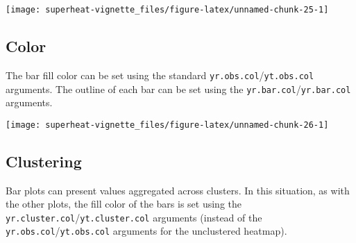 \documentclass[]{book}
\newenvironment{Shaded}{\begin{snugshade}}{\end{snugshade}}
\newcommand{\KeywordTok}[1]{\textcolor[rgb]{0.13,0.29,0.53}{\textbf{{#1}}}}
\newcommand{\DataTypeTok}[1]{\textcolor[rgb]{0.13,0.29,0.53}{{#1}}}
\newcommand{\FloatTok}[1]{\textcolor[rgb]{0.00,0.00,0.81}{{#1}}}
\newcommand{\StringTok}[1]{\textcolor[rgb]{0.31,0.60,0.02}{{#1}}}
\newcommand{\CommentTok}[1]{\textcolor[rgb]{0.56,0.35,0.01}{\textit{{#1}}}}
\newcommand{\NormalTok}[1]{{#1}}
\theoremstyle{definition}
\theoremstyle{definition}
\theoremstyle{remark}
\begin{document}
\begin{center}\texttt{[image: superheat-vignette\_files/figure-latex/unnamed-chunk-25-1]} \end{center}

\subsection{Color}\label{color-3}

The bar fill color can be set using the standard
\texttt{yr.obs.col}/\texttt{yt.obs.col} arguments. The outline of each
bar can be set using the \texttt{yr.bar.col}/\texttt{yr.bar.col}
arguments.

\begin{Shaded}
\end{Shaded}

\begin{center}\texttt{[image: superheat-vignette\_files/figure-latex/unnamed-chunk-26-1]} \end{center}

\subsection{Clustering}\label{clustering-3}

Bar plots can present values aggregated across clusters. In this
situation, as with the other plots, the fill color of the bars is set
using the \texttt{yr.cluster.col}/\texttt{yt.cluster.col} arguments
(instead of the \texttt{yr.obs.col}/\texttt{yt.obs.col} arguments for
the unclustered heatmap).
\end{document}

